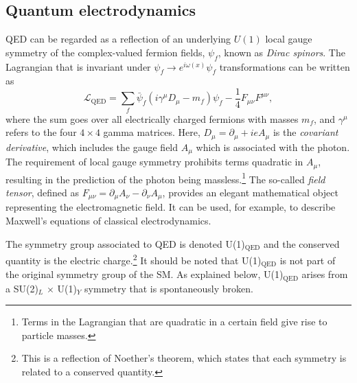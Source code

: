 \subsection{Quantum electrodynamics}
\label{subsec:qed}
QED can be regarded as a reflection of an underlying $U(1)$ local gauge symmetry of the complex-valued fermion fields, $\psi_f$, known as \emph{Dirac spinors}.
The Lagrangian that is invariant under $\psi_f \rightarrow e^{i \omega(x)} \psi_f$ transformations can be written as
\begin{equation}
  \mathcal{L}_{\text{QED}} = \sum_f \bar{\psi}_f(i\gamma^\mu D_\mu - m_f)\psi_f - \frac{1}{4}F_{\mu\nu}F^{\mu\nu},
  \label{eq:Lagrangianqed}
\end{equation}
where the sum goes over all electrically charged fermions with masses $m_f$, and $\gamma^\mu$ refers to the four $4 \times 4$ gamma matrices.
Here, $D_\mu = \partial_\mu + ieA_\mu$ is the \emph{covariant derivative}, which includes the gauge field $A_\mu$ which is associated with the photon. The requirement of local gauge symmetry prohibits terms quadratic in $A_\mu$, resulting in the prediction of the photon being massless.\footnote{Terms in the Lagrangian that are quadratic in a certain field give rise to particle masses.}
The so-called \emph{field tensor}, defined as $F_{\mu\nu} = \partial_\mu A_\nu - \partial_\nu A_\mu$, provides an elegant mathematical object representing the electromagnetic field. It can be used, for example, to describe Maxwell's equations of classical electrodynamics.

The symmetry group associated to QED is denoted U(1)$_{\text{QED}}$ and the conserved quantity is the electric charge.\footnote{This is a reflection of Noether's theorem, which states that each symmetry is related to a conserved quantity.}
It should be noted that U(1)$_{\text{QED}}$ is not part of the original symmetry group of the SM. As explained below, U(1)$_{\text{QED}}$ arises from a SU(2)$_L$ $\times$ U(1)$_Y$ symmetry that is spontaneously broken.


